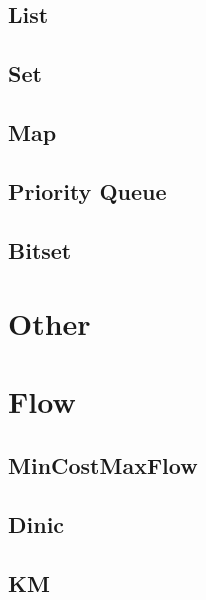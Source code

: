 \subsection{List}


\subsection{Set}


\subsection{Map}


\subsection{Priority Queue}


\subsection{Bitset}


\section{Other}


\section{Flow}

\subsection{MinCostMaxFlow}




\subsection{Dinic}




\subsection{KM}



